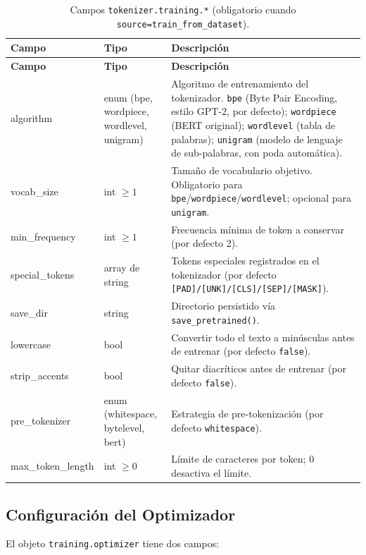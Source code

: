\begin{longtable}{>{\ttfamily\footnotesize\raggedright\arraybackslash}p{5.6cm}>{\raggedright\arraybackslash}p{2.4cm}>{\raggedright\arraybackslash}p{6.9cm}}
\toprule
\textbf{Campo} & \textbf{Tipo} & \textbf{Descripción} \\
\midrule
\endfirsthead
\toprule
\textbf{Campo} & \textbf{Tipo} & \textbf{Descripción} \\
\midrule
\endhead
\bottomrule
\caption{Campos \texttt{tokenizer.training.*} (obligatorio cuando \texttt{source=train\_from\_dataset}).}
\label{tab:tokenizer-training}
\endlastfoot
algorithm & enum (bpe, wordpiece, wordlevel, unigram) & Algoritmo de entrenamiento del tokenizador. \texttt{bpe} (Byte Pair Encoding, estilo GPT-2, por defecto); \texttt{wordpiece} (BERT original); \texttt{wordlevel} (tabla de palabras); \texttt{unigram} (modelo de lenguaje de sub-palabras, con poda automática). \\
vocab\_size & int $\ge 1$ & Tamaño de vocabulario objetivo. Obligatorio para \texttt{bpe}/\texttt{wordpiece}/\texttt{wordlevel}; opcional para \texttt{unigram}. \\
min\_frequency & int $\ge 1$ & Frecuencia mínima de token a conservar (por defecto 2). \\
special\_tokens & array de string & Tokens especiales registrados en el tokenizador (por defecto \texttt{[PAD]/[UNK]/[CLS]/[SEP]/[MASK]}). \\[\smallskipamount]
save\_dir & string & Directorio persistido vía \texttt{save\_pretrained()}. \\
lowercase & bool & Convertir todo el texto a minúsculas antes de entrenar (por defecto \texttt{false}). \\
strip\_accents & bool & Quitar diacríticos antes de entrenar (por defecto \texttt{false}). \\
pre\_tokenizer & enum (whitespace, bytelevel, bert) & Estrategia de pre-tokenización (por defecto \texttt{whitespace}). \\
max\_token\_length & int $\ge 0$ & Límite de caracteres por token; 0 desactiva el límite. \\
\end{longtable}

\subsection{Configuración del Optimizador}
\label{subsec:optimizer-config}

El objeto \texttt{training.optimizer} tiene dos campos:

